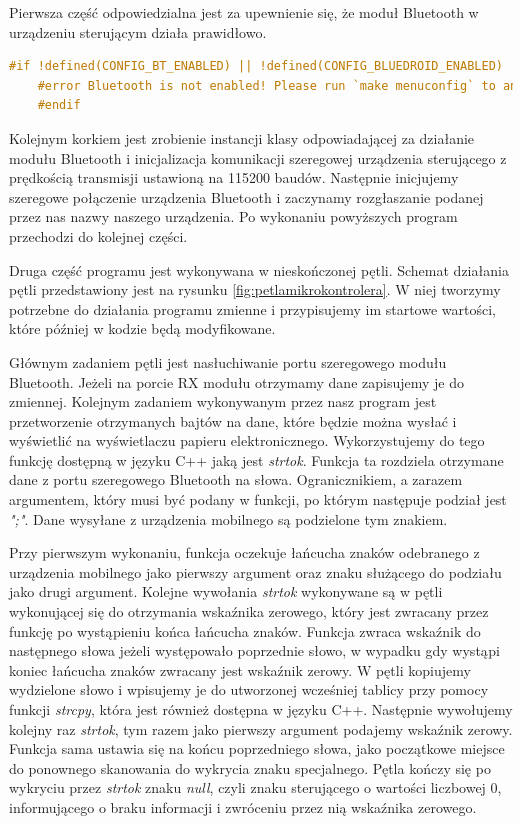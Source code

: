 \documentclass[a4paper,12pt, twoside]{article}
\begin{document}
        Pierwsza część odpowiedzialna jest za upewnienie się, że moduł Bluetooth w urządzeniu sterującym działa prawidłowo.
        \vspace{1cm}
    \begin{lstlisting}[language=C++, caption=Sprawdzenie poprawności działania Bluetooth]
    #if !defined(CONFIG_BT_ENABLED) || !defined(CONFIG_BLUEDROID_ENABLED)
    #error Bluetooth is not enabled! Please run `make menuconfig` to and enable it
    #endif\end{lstlisting}
    	\vspace{.5cm}
    	Kolejnym korkiem jest zrobienie instancji klasy odpowiadającej za działanie modułu Bluetooth i inicjalizacja komunikacji szeregowej urządzenia sterującego z prędkością transmisji ustawioną na 115200 baudów\cite{baud}. Następnie inicjujemy szeregowe połączenie urządzenia Bluetooth i zaczynamy rozgłaszanie podanej przez nas nazwy naszego urządzenia. Po wykonaniu powyższych program przechodzi do kolejnej części.
    	
    	Druga część programu jest wykonywana w nieskończonej pętli. Schemat działania pętli przedstawiony jest na rysunku \ref{fig:petlamikrokontrolera}. W niej tworzymy potrzebne do działania programu zmienne i przypisujemy im startowe wartości, które później w kodzie będą modyfikowane. 
    	
    	Głównym zadaniem pętli jest nasłuchiwanie portu szeregowego modułu Bluetooth. Jeżeli na porcie RX modułu otrzymamy dane zapisujemy je do zmiennej. Kolejnym zadaniem wykonywanym przez nasz program jest przetworzenie otrzymanych bajtów na dane, które będzie można wysłać i wyświetlić na wyświetlaczu papieru elektronicznego. Wykorzystujemy do tego funkcję dostępną w języku C++ jaką jest \textit{strtok}\cite{strtok}. Funkcja ta rozdziela otrzymane dane z portu szeregowego Bluetooth na słowa. \label{petladekod}Ogranicznikiem, a zarazem argumentem, który musi być podany w funkcji, po którym następuje podział jest \textit{";"}. Dane wysyłane z urządzenia mobilnego są podzielone tym znakiem. 
    	
    	Przy pierwszym wykonaniu, funkcja oczekuje łańcucha znaków odebranego z urządzenia mobilnego jako pierwszy argument oraz znaku służącego do podziału jako drugi argument. Kolejne wywołania \textit{strtok} wykonywane są w pętli wykonującej się do otrzymania wskaźnika zerowego, który jest zwracany przez funkcję po wystąpieniu końca łańcucha znaków. Funkcja zwraca wskaźnik do następnego słowa jeżeli występowało poprzednie słowo, w wypadku gdy wystąpi koniec łańcucha znaków zwracany jest wskaźnik zerowy. W pętli kopiujemy wydzielone słowo i wpisujemy je do utworzonej wcześniej tablicy przy pomocy funkcji \textit{strcpy}\cite{strcpy}, która jest również dostępna w języku C++. Następnie wywołujemy kolejny raz \textit{strtok}, tym razem jako pierwszy argument podajemy wskaźnik zerowy. Funkcja sama ustawia się na końcu poprzedniego słowa, jako początkowe miejsce do ponownego skanowania do wykrycia znaku specjalnego. Pętla kończy się po wykryciu przez \textit{strtok} znaku \textit{null}, czyli znaku sterującego o wartości liczbowej 0, informującego o braku informacji\cite{null} i zwróceniu przez nią wskaźnika zerowego. 
    	
\end{document}
